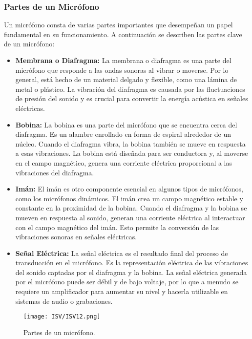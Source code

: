 \documentclass[
	12pt, %
	fleqn, %
	a4paper, %
	oneside, %
]{LegrandOrangeBook}
\begin{document}
\subsubsection*{Partes de un Micrófono}
Un micrófono consta de varias partes importantes que desempeñan un papel fundamental en su funcionamiento. A continuación se describen las partes clave de un micrófono:
\begin{itemize}
\item \textbf{Membrana o Diafragma:} La membrana o diafragma es una parte del micrófono que responde a las ondas sonoras al vibrar o moverse. Por lo general, está hecho de un material delgado y flexible, como una lámina de metal o plástico. La vibración del diafragma es causada por las fluctuaciones de presión del sonido y es crucial para convertir la energía acústica en señales eléctricas.

\item \textbf{Bobina:} La bobina es una parte del micrófono que se encuentra cerca del diafragma. Es un alambre enrollado en forma de espiral alrededor de un núcleo. Cuando el diafragma vibra, la bobina también se mueve en respuesta a esas vibraciones. La bobina está diseñada para ser conductora y, al moverse en el campo magnético, genera una corriente eléctrica proporcional a las vibraciones del diafragma.

\item \textbf{Imán:} El imán es otro componente esencial en algunos tipos de micrófonos, como los micrófonos dinámicos. El imán crea un campo magnético estable y constante en la proximidad de la bobina. Cuando el diafragma y la bobina se mueven en respuesta al sonido, generan una corriente eléctrica al interactuar con el campo magnético del imán. Esto permite la conversión de las vibraciones sonoras en señales eléctricas.

\item \textbf{Señal Eléctrica:} La señal eléctrica es el resultado final del proceso de transducción en el micrófono. Es la representación eléctrica de las vibraciones del sonido captadas por el diafragma y la bobina. La señal eléctrica generada por el micrófono puede ser débil y de bajo voltaje, por lo que a menudo se requiere un amplificador para aumentar su nivel y hacerla utilizable en sistemas de audio o grabaciones.
\end{itemize}
\begin{figure}[H]
\centering
\texttt{[image: ISV/ISV12.png]}
\caption{Partes de un micrófono.}
\end{figure}
\end{document}
